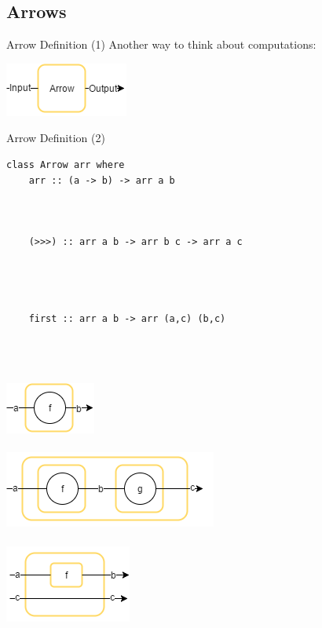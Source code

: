 \subsection{Arrows}
\begin{frame}[fragile]{Arrow Definition (1)}
\centering Another way to think about computations:
\begin{center}
	\includegraphics[scale=0.8]{images/arrow}~\\
\end{center}
\end{frame}

\begin{frame}[fragile]{Arrow Definition (2)}
\begin{minipage}{0.6\textwidth}
\begin{lstlisting}[frame=htrbl, numbers=none]
class Arrow arr where
	arr :: (a -> b) -> arr a b
	
	
	
	(>>>) :: arr a b -> arr b c -> arr a c
	
	
	
	
	first :: arr a b -> arr (a,c) (b,c)
\end{lstlisting}
\vfill
\end{minipage}
\hspace*{0.03\textwidth}
\begin{minipage}{0.25\textwidth}
	~\\~\\~\\
	\includegraphics[scale=0.6]{images/arr}~\\~\\
	\includegraphics[scale=0.6]{images/compose}~\\~\\
	\includegraphics[scale=0.6]{images/first}~\\~\\
\end{minipage}
\end{frame}

